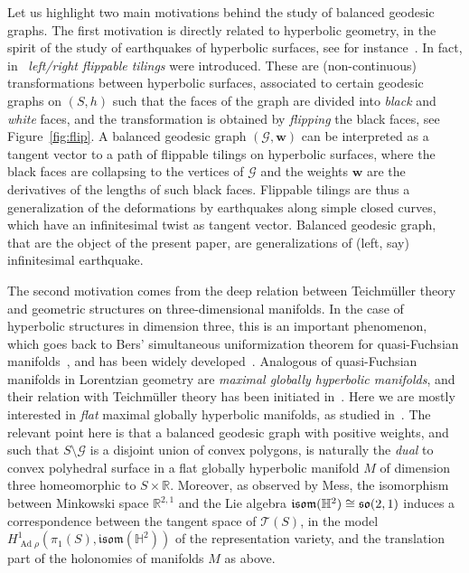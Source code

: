 \documentclass[11pt]{article}
\theoremstyle{definition}
\numberwithin{equation}{section}
\numberwithin{figure}{section}
\numberwithin{table}{section}
\newcommand{\Teich}{\mathcal{T}}
\newcommand{\Hyp}{\mathbb{H}}
\newcommand{\R}{{\mathbb R}}
\newcommand{\isom}{\mathfrak{isom}}
\newcommand{\so}{\mathfrak{so}}
\DeclareMathOperator{\Ad}{Ad}
\begin{document}
Let us highlight two main motivations behind the study of balanced geodesic graphs. The first motivation is directly related to hyperbolic geometry, in the spirit of the study of earthquakes of hyperbolic surfaces, see for instance~\cite{bonahonearth,mcmullerearth,thurstonearth}. In fact, in~\cite{flippable} \emph{left/right flippable tilings} were introduced. These are (non-continuous) transformations between hyperbolic surfaces, associated to certain geodesic graphs on $(S,h)$ such that the faces of the graph are divided into \emph{black} and \emph{white} faces, and the transformation is obtained by \emph{flipping} the black faces, see Figure~\ref{fig:flip}. A balanced geodesic graph $(\mathcal G,\mathbf w)$ can be interpreted as a tangent vector to a path of flippable tilings on hyperbolic surfaces, where the black faces are collapsing to the vertices of $\mathcal G$ and the weights $\mathbf w$ are the derivatives of the lengths of such black faces. Flippable tilings are thus a generalization of the deformations by earthquakes along simple closed curves, which have an infinitesimal twist as tangent vector. Balanced geodesic graph, that are the object of the present paper, are generalizations of (left, say) infinitesimal earthquake.

The second motivation comes from the deep relation between Teichm\"uller theory and geometric structures on three-dimensional manifolds. In the case of hyperbolic structures in dimension three, this is an important phenomenon, which goes back to Bers' simultaneous uniformization theorem for quasi-Fuchsian manifolds~\cite{bers}, and has been widely developed~\cite{bonahonbouts,BrockWPconvexcore,seppiminimal,taubes,uhlenbeck}. Analogous of quasi-Fuchsian manifolds in Lorentzian geometry are \emph{maximal globally hyperbolic manifolds}, and their relation with Teichm\"uller theory has been initiated in~\cite{mess}. Here we are mostly interested in \emph{flat} maximal globally hyperbolic manifolds, as studied in~\cite{barbot,Bonsante,bonseppicodazzi}. The relevant point here is that a balanced geodesic graph {with positive weights, and such that $S\setminus\mathcal{G}$ is a disjoint union of convex polygons,} is naturally the \emph{dual} to convex polyhedral surface in a flat globally hyperbolic manifold $M$ of dimension three {homeomorphic to $S\times \R$}. Moreover, as observed by Mess, the isomorphism between Minkowski space $\R^{2,1}$ and the Lie algebra $\isom(\Hyp^2)\linebreak\cong\so(2,1)$ induces a correspondence between the tangent space of $\Teich(S)$, in the model $H^1_{\Ad\rho}(\pi_1(S),\isom(\Hyp^2))$ of the representation variety, and the translation part of the holonomies of manifolds $M$ as above.
\end{document}
